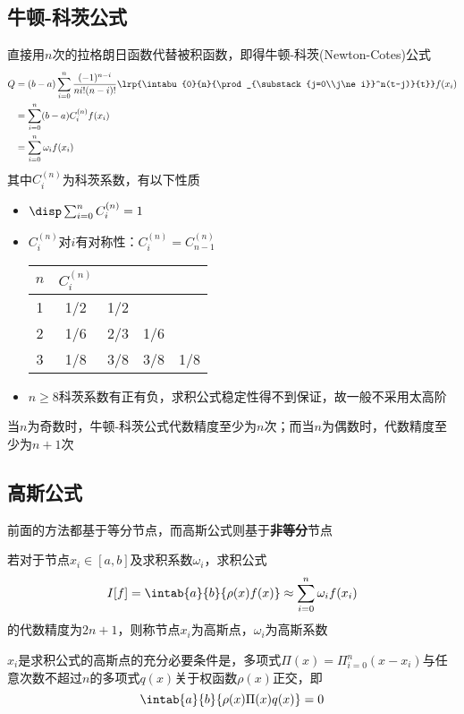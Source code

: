 \subsection{牛顿-科茨公式}
直接用$n$次的拉格朗日函数代替被积函数，即得牛顿-科茨(Newton-Cotes)公式
\[\begin{aligned}
    Q&=(b-a)\sum_{i=0}^n\frac{(-1)^{n-i}}{ni!(n-i)!}\lrp{\intabu{0}{n}{\prod_{\substack{j=0\\j\ne i}}^n(t-j)}{t}}f(x_i)\\
    &=\sum_{i=0}^n(b-a)C_i^{(n)} f(x_i)\\
    &=\sum_{i=0}^n\omega_if(x_i)
\end{aligned}\]
其中$C_i^{(n)}$为科茨系数，有以下性质
\begin{itemize}
    \item $\disp\sum_{i=0}^nC_{i}^{(n)}=1$
    \item $C_i^{(n)}$对$i$有对称性：$C_i^{(n)}=C_{n-1}^{(n)}$
\begin{center}
\begin{tabular}{c|cccc}\hline
$n$ & $C_i^{(n)}$\\\hline
1 & 1/2 & 1/2 \\\hline
2 & 1/6 & 2/3 & 1/6\\\hline
3 & 1/8 & 3/8 & 3/8 & 1/8\\\hline
\end{tabular}
\end{center}
    \item $n\geq 8$科茨系数有正有负，求积公式稳定性得不到保证，故一般不采用太高阶
\end{itemize}
\begin{theorem}
    当$n$为奇数时，牛顿-科茨公式代数精度至少为$n$次；而当$n$为偶数时，代数精度至少为$n+1$次
\end{theorem}

\subsection{高斯公式}
前面的方法都基于等分节点，而高斯公式则基于\textbf{非等分}节点
\begin{definition}
    若对于节点$x_i\in[a,b]$及求积系数$\omega_i$，求积公式
    \[I[f]=\intab{a}{b}{\rho(x)f(x)}\approx\sum_{i=0}^n\omega_if(x_i)\]
    的代数精度为$2n+1$，则称节点$x_i$为高斯点，$\omega_i$为高斯系数
\end{definition}
\begin{theorem}
    $x_i$是求积公式的高斯点的充分必要条件是，多项式$\Pi(x)=\Pi_{i=0}^n(x-x_i)$与任意次数不超过$n$的多项式$q(x)$关于权函数$\rho(x)$正交，即
    \[\intab{a}{b}{\rho(x)\Pi(x)q(x)}=0\]
\end{theorem}

